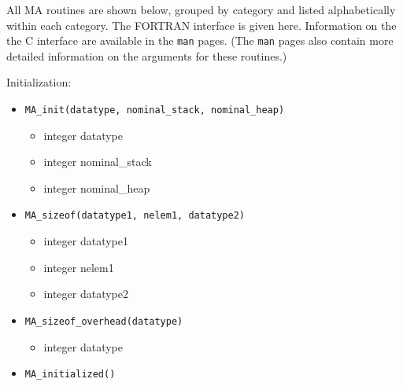 All MA routines are shown below, grouped by category and listed
alphabetically within each category.  The FORTRAN interface is given
here.  Information on the the C interface are available in the \verb+man+ pages.
(The \verb+man+ pages also contain more
detailed information on the
arguments for these routines.)

Initialization: 
\begin{itemize}
\item {\tt MA\_init(datatype, nominal\_stack, nominal\_heap)}
\begin{itemize}
\item      integer datatype
\item      integer nominal\_stack
\item      integer nominal\_heap
\end{itemize}

\item {\tt MA\_sizeof(datatype1, nelem1, datatype2)}
\begin{itemize}
\item      integer datatype1
\item      integer nelem1
\item      integer datatype2
\end{itemize}

\item {\tt MA\_sizeof\_overhead(datatype)}
\begin{itemize}
\item      integer datatype
\end{itemize}

\item {\tt MA\_initialized()}

\end{itemize}

